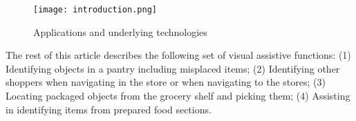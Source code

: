 \begin{figure}[!htb]
\centering
\texttt{[image: introduction.png]}
\caption{Applications and underlying technologies}
\label{fig:introduction}
\end{figure} 

The rest of this article describes the following set of visual
assistive functions: (1) Identifying objects in a pantry including
misplaced items; (2) Identifying other shoppers when navigating in the
store or when navigating to the stores; (3) Locating packaged objects
from the grocery shelf and picking them; (4) Assisting in identifying
items from prepared food sections. 

